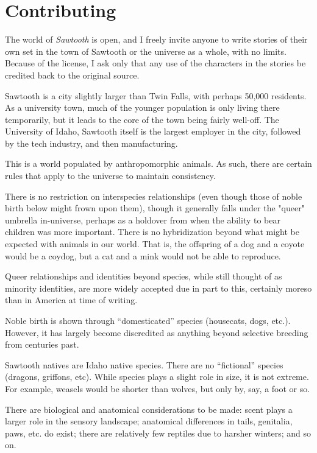 \chapter*{Contributing}

The world of \emph{Sawtooth} is open, and I freely invite anyone to write stories of their own set in the town of Sawtooth or the universe as a whole, with no limits. Because of the license, I ask only that any use of the characters in the stories be credited back to the original source.

Sawtooth is a city slightly larger than Twin Falls, with perhaps 50,000 residents. As a university town, much of the younger population is only living there temporarily, but it leads to the core of the town being fairly well-off. The University of Idaho, Sawtooth itself is the largest employer in the city, followed by the tech industry, and then manufacturing.

This is a world populated by anthropomorphic animals. As such, there are certain rules that apply to the universe to maintain consistency.

There is no restriction on interspecies relationships (even though those of noble birth below might frown upon them), though it generally falls under the "queer" umbrella in-universe, perhaps as a holdover from when the ability to bear children was more important. There is no hybridization beyond what might be expected with animals in our world. That is, the offspring of a dog and a coyote would be a coydog, but a cat and a mink would not be able to reproduce.

Queer relationships and identities beyond species, while still thought of as minority identities, are more widely accepted due in part to this, certainly moreso than in America at time of writing.

Noble birth is shown through ``domesticated'' species (housecats, dogs, etc.). However, it has largely become discredited as anything beyond selective breeding from centuries past.

Sawtooth natives are Idaho native species. There are no ``fictional'' species (dragons, griffons, etc). While species plays a slight role in size, it is not extreme. For example, weasels would be shorter than wolves, but only by, say, a foot or so.

There are biological and anatomical considerations to be made: scent plays a larger role in the sensory landscape; anatomical differences in tails, genitalia, paws, etc. do exist; there are relatively few reptiles due to harsher winters; and so on.

